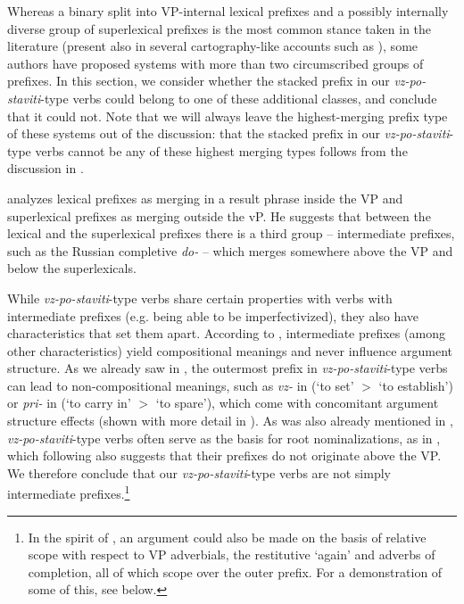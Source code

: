 \documentclass[output=paper,colorlinks,citecolor=brown]{langscibook}
\begin{document}
 Whereas a binary split into VP-internal lexical prefixes and a possibly internally diverse group of superlexical prefixes is the most common stance taken in the literature (present also in several cartography-like accounts such as \citealt{wiland2012prefix}), some authors have proposed systems with more than two circumscribed groups of prefixes. In this section, we consider whether the stacked prefix in our \textit{vz-po-staviti}-type verbs could belong to one of these additional classes, and conclude that it could not. Note that we will always leave the highest-merging prefix type of these systems out of the discussion: that the stacked prefix in our \textit{vz-po-staviti}-type verbs cannot be any of these highest merging types follows from the discussion in .
 

 \citet{tatevosov2008intermediate} analyzes lexical prefixes as merging in a result phrase inside the VP and superlexical prefixes as merging outside the vP. He suggests that between the lexical and the superlexical prefixes there is a third group -- intermediate prefixes, such as the Russian completive \textit{do-} -- which merges somewhere above the VP and below the superlexicals. 

 While \textit{vz-po-staviti}-type verbs share certain properties with verbs with intermediate prefixes (e.g. being able to be imperfectivized), they also have characteristics that set them apart. According to \citet{tatevosov2008intermediate}, intermediate prefixes (among other characteristics) yield compositional meanings and never influence argument structure. As we already saw in , the outermost prefix in \textit{vz-po-staviti}-type verbs can lead to non-compositional meanings, such as \textit{vz-} in  (`to set’ $>$ `to establish’) or \textit{pri-} in  (`to carry in’ $>$ `to spare’), which come with concomitant argument structure effects (shown with more detail in ). As was also already mentioned in , \textit{vz-po-staviti}-type verbs often serve as the basis for root nominalizations, as in , which following \citet{svenonius2004slavic} also suggests that their prefixes do not originate above the VP. We therefore conclude that our \textit{vz-po-staviti}-type verbs are not simply intermediate prefixes.\footnote{In the spirit of \citet{zaucer2013}, an argument could also be made on the basis of relative scope with respect to VP adverbials, the restitutive `again' and adverbs of completion, all of which scope over the outer prefix. For a demonstration of some of this, see  below.}
\end{document}
